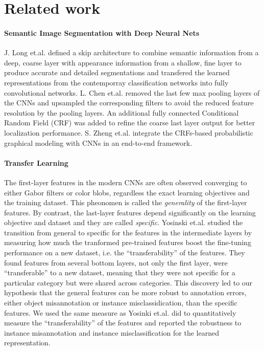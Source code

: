 \section{Related work}
\label{sec:related}

\paragraph{Semantic Image Segmentation with Deep Neural Nets}

J. Long et.al.\cite{long2015fully} defined a skip architecture to combine semantic information from a deep, coarse layer with appearance information from a shallow, fine layer to produce accurate and detailed segmentations and transfered the learned representations from the contemporray classification networks into fully convolutional networks.
L. Chen et.al.\cite{chen2016deeplab} removed the last few max pooling layers of the CNNs and upsampled the corresponding filters to avoid the reduced feature resolution by the pooling layers. An additional fully connected Conditional Random Field (CRF) was added to refine the coarse last layer output for better localization performance.
S. Zheng et.al.\cite{zheng2015conditional} integrate the CRFs-based probabilistic graphical modeling with CNNs in an end-to-end framework.

\paragraph{Transfer Learning}
The first-layer features in the modern CNNs are often observed converging to either Gabor filters or color blobs, regardless the exact learning objectives and the training dataset.
This pheonomen is called the \textit{generality} of the first-layer features.
By contrast, the last-layer features depend significantly on the learning objective and dataset and they are called \textit{specific}.
Yosinski et.al.\cite{yosinski2014transferable} studied the transition from general to specific for the features in the intermediate layers by measuring how much the tranformed  pre-trained features boost the fine-tuning performance on a new dataset, i.e. the ``transferability'' of the features.
They found features from several bottom layers, not only the first layer, were ``transferable'' to a new dataset, meaning that they were not specific for a particular category but were shared across categories.
This discovery led to our hypothesis that the general features can be more robust to annotation errors, either object misannotation or instance misclassidication, than the specific features.
We used the same measure as Yosinki et.al. did to quantitatively measure the ``transferability'' of the features and reported the robustness to instance misannotation and instance misclassification for the learned representation.

